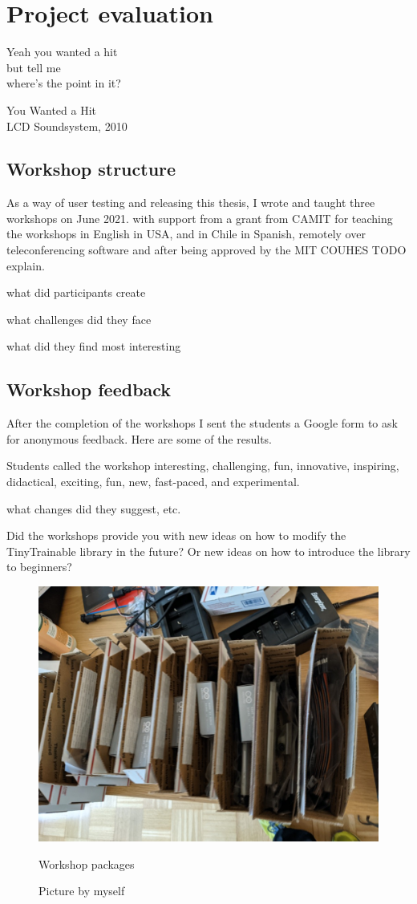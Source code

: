 \chapter{Project evaluation}

\epigraph{Yeah you wanted a hit \\ but tell me \\ where's the point in it?}{You Wanted a Hit \\ LCD Soundsystem, 2010}

\section{Workshop structure}

As a way of user testing and releasing this thesis, I wrote and taught three workshops on June 2021. with support from a grant from \acrlong{CAMIT} for teaching the workshops in English in USA, and in Chile in Spanish, remotely over teleconferencing software and after being approved by the \acrshort{MIT} \acrfull{COUHES} TODO explain.

what did participants create

what challenges did they face

what did they find most interesting

\section{Workshop feedback}

After the completion of the workshops I sent the students a Google form to ask for anonymous feedback. Here are some of the results.

Students called the workshop interesting, challenging, fun, innovative, inspiring, didactical, exciting, fun, new, fast-paced, and experimental.


what changes did they suggest, etc.

Did the workshops provide you with new ideas on how to modify the TinyTrainable library in the future? Or new ideas on how to introduce the library to beginners?

\begin{figure}[ht]
  \centering
  \includegraphics[width=0.75\linewidth,height=0.25\textheight,keepaspectratio]{images/workshop-packages.jpg}
  \caption{Workshop packages}
  \caption*{Picture by myself}
  \label{fig:workshop-packages}
\end{figure}

